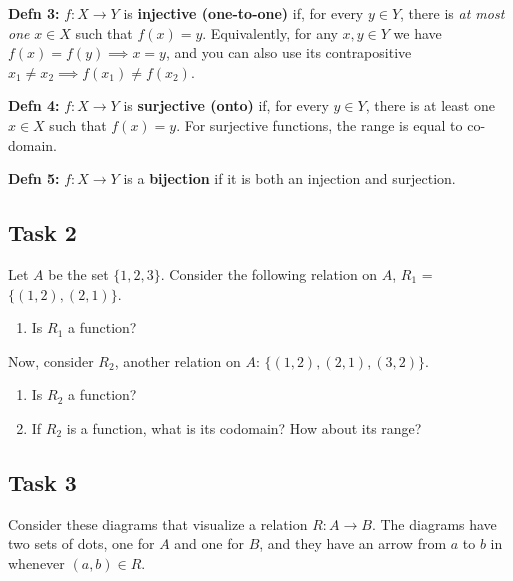 \documentclass[12pt,letterpaper]{article}
\newif\ifsol
\newcommand{\solu}[2]{ \begin{mdframed} \ifsol #2 \else \vspace{#1} \fi \end{mdframed} }
\begin{document}
      \textbf{Defn 3:} $f : X \rightarrow Y$ is \textbf{injective (one-to-one)}  if, for every $y \in Y$, there is \textit{at most one} $x \in X$ such that $f(x) = y$. Equivalently, for any $x,y\in Y$ we have $ f(x) = f(y)\implies x=y$, and you can also use its contrapositive $x_1 \not= x_2 \implies f(x_1) \not= f(x_2)$.

      \textbf{Defn 4:} $f : X \rightarrow Y$ is \textbf{surjective (onto)} if, for every $y \in Y$, there is at least one $x \in X$ such that $f(x) = y$. For surjective functions, the range is equal to co-domain.

      \textbf{Defn 5:} $f : X \rightarrow Y$ is a \textbf{bijection} if it is both an injection and surjection. 

      \subsection*{Task 2}
      
      Let $A$ be the set $\{1, 2, 3\}$. Consider the following relation on $A$, $R_1$ = $\{(1, 2), (2, 1)\}$. 

      \begin{enumerate}[1.]
      \item Is $R_1$ a function? 
      \solu{1 cm}{No; not all members of $A$ are mapped to something in $A$. It is a partial function but not a (total) function.}
      \end{enumerate}

      Now, consider $R_2$, another relation on $A$:  $\{(1, 2), (2, 1), (3, 2)\}$. 
      \begin{enumerate}[1.]
      \item Is $R_2$ a function? 
      \solu{1 cm}{Yes.}
      \item If $R_2$ is a function, what is its codomain? How about its range?
       \solu{1 cm}{The codomain is $A$. The range is $\{1, 2\}$.}
      \end{enumerate}

      \subsection*{Task 3}
      
      Consider these diagrams that visualize a relation $R:A \rightarrow B$. The diagrams have two sets of dots, one for $A$ and one for $B$, and they have an arrow from $a$ to $b$ in whenever $(a, b)\in R$.
      
\end{document}

